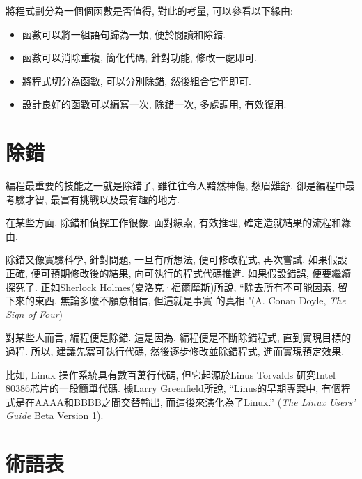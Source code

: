 \documentclass[10pt]{book}
\begin{document}
將程式劃分為一個個函數是否值得, 對此的考量, 可以參看以下緣由:

\begin{itemize}

\item 函數可以將一組語句歸為一類, 便於閱讀和除錯. 

\item 函數可以消除重複, 簡化代碼, 針對功能, 修改一處即可. 

\item 將程式切分為函數, 可以分別除錯, 然後組合它們即可. 

\item 設計良好的函數可以編寫一次, 除錯一次, 多處調用, 有效復用. 

\end{itemize}


\section{除錯}

編程最重要的技能之一就是除錯了, 雖往往令人黯然神傷, 愁眉難舒, 
卻是編程中最考驗才智, 最富有挑戰以及最有趣的地方.

在某些方面, 除錯和偵探工作很像. 面對線索, 有效推理, 確定造就結果的流程和緣由. 

除錯又像實驗科學, 針對問題, 一旦有所想法, 便可修改程式, 再次嘗試. 
如果假設正確, 便可預期修改後的結果, 向可執行的程式代碼推進. 
如果假設錯誤, 便要繼續探究了. 正如Sherlock Holmes(夏洛克·福爾摩斯)所說, 
``除去所有不可能因素, 留下來的東西, 無論多麼不願意相信, 但這就是事實
的真相."(A. Conan Doyle, {\em The Sign of Four})

對某些人而言, 編程便是除錯. 這是因為, 編程便是不斷除錯程式, 直到實現目標的過程. 
所以, 建議先寫可執行代碼, 然後逐步修改並除錯程式, 進而實現預定效果. 

比如, Linux 操作系統具有數百萬行代碼,  但它起源於Linus Torvalds
研究Intel 80386芯片的一段簡單代碼. 據Larry Greenfield所說, 
``Linus的早期專案中, 有個程式是在AAAA和BBBB之間交替輸出, 而這後來演化為了Linux.''
({\em The Linux Users' Guide} Beta Version 1).


\section{術語表}
\end{document}
